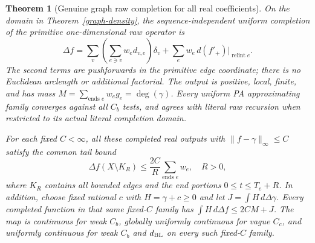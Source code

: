 \documentclass[11pt]{article}
\newtheorem{theorem}{Theorem}
\begin{document}
\begin{theorem}[Genuine graph raw completion for all real coefficients]\label{graph-operator}
On the domain in Theorem~\ref{graph-density}, the sequence-independent
uniform completion of the primitive one-dimensional raw operator is
\[
 \Delta f=\sum_v\left(\sum_{e\ni v}w_ed_{v,e}\right)\delta_v
          +\sum_e w_e\,d(f'_+)\big|_{\operatorname{relint}e}.
\]
The second terms are pushforwards in the primitive edge coordinate;
there is no Euclidean arclength or additional factorial. The output is
positive, local, finite, and has mass $M=\sum_{\text{ends }e}w_eg_e
=\deg(\gamma)$. Every uniform PA approximating family converges against
all $C_b$ tests, and agrees with literal raw recursion when restricted
to its actual literal completion domain.

For each fixed $C<\infty$, all these completed real outputs with
$\|f-\gamma\|_\infty\leq C$ satisfy the common tail bound
\[
 \Delta f(X\setminus K_R)\leq\frac{2C}{R}\sum_{\text{ends }e}w_e,
 \quad R>0,
\]
where $K_R$ contains all bounded edges and the end portions
$0\leq t\leq T_e+R$. In addition, choose fixed rational $c$ with
$H=\gamma+c\geq0$ and let $J=\int H\,d\Delta\gamma$. Every completed
function in that same fixed-$C$ family has
$\int H\,d\Delta f\leq2CM+J$. The map is continuous for weak $C_b$, globally
uniformly continuous for vague $C_c$, and uniformly continuous for
weak $C_b$ and $d_{\rm BL}$ on every such \emph{fixed-$C$} family.
\end{theorem}
\end{document}
